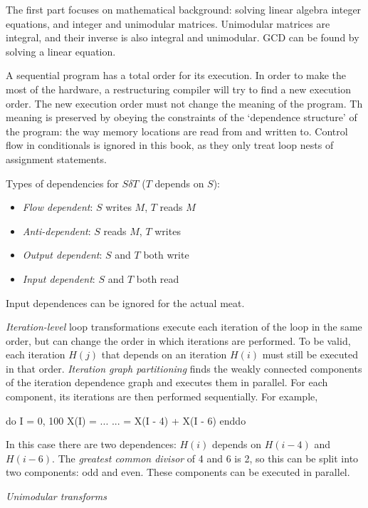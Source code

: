 The first part focuses on mathematical background: solving linear algebra integer equations, and integer and unimodular matrices.
Unimodular matrices are integral, and their inverse is also integral and unimodular. GCD can be found by solving a linear equation.

A sequential program has a total order for its execution. In order to make the most of the hardware, a restructuring compiler
will try to find a new execution order. The new execution order must not change the meaning of the program.
Th meaning is preserved by obeying the constraints of the `dependence structure' of the program:
the way memory locations are read from and written to.
Control flow in conditionals is ignored in this book, as they only treat loop nests of assignment statements.

Types of dependencies for $S \delta T$ ($T$ depends on $S$):
\begin{itemize}
\item \emph{Flow dependent}: $S$ writes $M$, $T$ reads $M$
\item \emph{Anti-dependent}: $S$ reads $M$, $T$ writes
\item \emph{Output dependent}: $S$ and $T$ both write
\item \emph{Input dependent}: $S$ and $T$ both read
\end{itemize}

Input dependences can be ignored for the actual meat.

\emph{Iteration-level} loop transformations execute each iteration of the loop in the same order, but can change the order in which iterations are performed.
To be valid, each iteration $H(j)$ that depends on an iteration $H(i)$ must still be executed in that order.
\emph{Iteration graph partitioning} finds the weakly connected components of the iteration dependence graph and executes them in parallel. For each component, its iterations are then performed sequentially.
For example,
\begin{code}
do I = 0, 100
    X(I) = ...
    ...  = X(I - 4) + X(I - 6)
enddo
\end{code}
In this case there are two dependences: $H(i)$ depends on $H(i-4)$ and $H(i-6)$.
The \emph{greatest common divisor} of 4 and 6 is 2, so this can be split into two components: odd and even.
These components can be executed in parallel.

\emph{Unimodular transforms}
